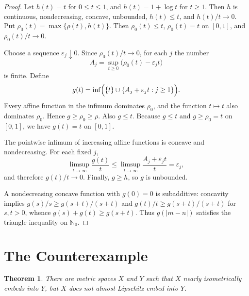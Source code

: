 \documentclass[11pt]{article}
\newtheorem{theorem}{Theorem}
\newcommand{\Nzero}{\mathbb N_0}
\begin{document}
\begin{proof}
Let \(h(t)=t\) for \(0\le t\le1\), and \(h(t)=1+\log t\) for \(t\ge1\).
Then \(h\) is continuous, nondecreasing, concave, unbounded,
\(h(t)\le t\), and \(h(t)/t\to0\).  Put \(\rho_0(t)=\max\{\rho(t),h(t)\}\).
Then \(\rho_0(t)\le t\), \(\rho_0(t)=t\) on \([0,1]\), and
\(\rho_0(t)/t\to0\).

Choose a sequence \(\varepsilon_j\downarrow0\).  Since
\(\rho_0(t)/t\to0\), for each \(j\) the number
\[
A_j=\sup_{t\ge0}\bigl(\rho_0(t)-\varepsilon_j t\bigr)
\]
is finite.  Define
\[
g(t)=\inf\Bigl(\{t\}\cup \{A_j+\varepsilon_j t:j\ge1\}\Bigr).
\]
Every affine function in the infimum dominates \(\rho_0\), and the function
\(t\mapsto t\) also dominates \(\rho_0\).  Hence \(g\ge\rho_0\ge\rho\).
Also \(g\le t\).  Because \(g\le t\) and \(g\ge\rho_0=t\) on \([0,1]\),
we have \(g(t)=t\) on \([0,1]\).

The pointwise infimum of increasing affine functions is concave and
nondecreasing.  For each fixed \(j\),
\[
\limsup_{t\to\infty}\frac{g(t)}{t}
\le \limsup_{t\to\infty}\frac{A_j+\varepsilon_j t}{t}
=\varepsilon_j,
\]
and therefore \(g(t)/t\to0\).  Finally, \(g\ge h\), so \(g\) is unbounded.

A nondecreasing concave function with \(g(0)=0\) is subadditive: concavity
implies \(g(s)/s\ge g(s+t)/(s+t)\) and \(g(t)/t\ge g(s+t)/(s+t)\) for
\(s,t>0\), whence \(g(s)+g(t)\ge g(s+t)\).  Thus \(g(|m-n|)\) satisfies the
triangle inequality on \(\Nzero\).
\end{proof}

\section*{The Counterexample}

\begin{theorem}
There are metric spaces \(X\) and \(Y\) such that \(X\) nearly isometrically
embeds into \(Y\), but \(X\) does not almost Lipschitz embed into \(Y\).
\end{theorem}
\end{document}
